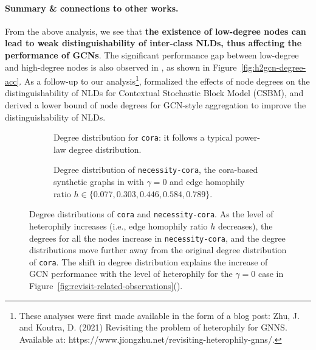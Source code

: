 \paragraph{Summary \& connections to other works.}
From the above analysis, we see that \textbf{the existence of low-degree nodes can lead to weak distinguishability of inter-class NLDs, thus affecting the performance of GCNs}. The significant performance gap between low-degree and high-degree nodes is also observed in \cite{zhu2020beyond},
as shown in Figure~\ref{fig:h2gcn-degree-acc}. 
As a follow-up to our analysis\footnote{These analyses were first made available in the form of a blog post: Zhu, J. and Koutra, D. (2021) Revisiting the problem of heterophily for GNNS. Available at: https://www.jiongzhu.net/revisiting-heterophily-gnns/.}, \citet{ma2021homophily} formalized the effects of node degrees on the distinguishability of NLDs for Contextual Stochastic Block Model (CSBM), and derived a lower bound of node degrees for GCN-style aggregation to improve the distinguishability of NLDs.


\begin{figure}[t]
    \centering
    \begin{subfigure}[t]{0.356\textwidth}
        \caption{Degree distribution for \texttt{cora}: it follows a typical power-law degree distribution.}
    \end{subfigure}
    \hspace{0.08\textwidth}
    \begin{subfigure}[t]{0.5\textwidth}
        \caption{Degree distribution of \texttt{necessity-cora}, the cora-based synthetic graphs in \cite{ma2021homophily} with $\gamma=0$ and edge homophily ratio $h\in \{0.077,0.303,0.446,0.584,0.789\}$.}
    \end{subfigure}
    \caption{Degree distributions of \texttt{cora} and \texttt{necessity-cora}. As the level of heterophily increases (i.e., edge homophily ratio $h$ decreases), the degrees for all the nodes increase in \texttt{necessity-cora}, and the degree distributions move further away from the original degree distribution of \texttt{cora}. The shift in degree distribution explains the increase of GCN performance with the level of heterophily for the $\gamma=0$ case in Figure~\ref{fig:revisit-related-observations}().}
    \label{fig:revisit-cora-necessity-degree}
    \vspace{-0.2cm}
\end{figure}

